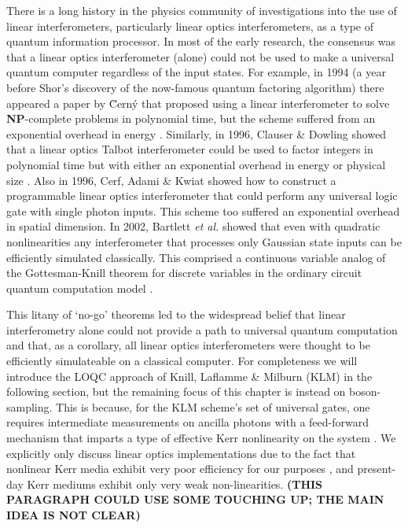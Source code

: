 \documentclass[aps,pra,twocolumn,amsmath,amssymb,nofootinbib,superscriptaddress]{revtex4}
\begin{document}
There is a long history in the physics community of investigations into the use of linear interferometers, particularly linear optics interferometers, as a type of quantum information processor. In most of the early research, the consensus was that a linear optics interferometer (alone) could not be used to make a universal quantum computer regardless of the input states. For example, in 1994 (a year before Shor's discovery of the now-famous quantum factoring algorithm) there appeared a paper by {\u C}ern{\' y} that proposed using a linear interferometer to solve \textbf{NP}-complete problems in polynomial time, but the scheme suffered from an exponential overhead in energy \cite{cerny}. Similarly, in 1996, Clauser \& Dowling showed that a linear optics Talbot interferometer could be used to factor integers in polynomial time but with either an exponential overhead in energy or physical size \cite{clauser}. Also in 1996, Cerf, Adami \& Kwiat showed how to construct a programmable linear optics interferometer that could perform any universal logic gate with single photon inputs.  This scheme too suffered an exponential overhead in spatial dimension. In 2002, Bartlett \emph{et al.} showed that even with quadratic nonlinearities any interferometer that processes only Gaussian state inputs can be efficiently simulated classically.  This comprised a continuous variable analog of the Gottesman-Knill theorem for discrete variables in the ordinary circuit quantum computation model \cite{bart}. 

This litany of `no-go' theorems led to the widespread belief that linear interferometry alone could not provide a path to universal quantum computation and that, as a corollary, all linear optics interferometers were thought to be efficiently simulateable on a classical computer. For completeness we will introduce the LOQC approach of Knill, Laflamme \& Milburn (KLM) \cite{knill,kok} in the following section, but the remaining focus of this chapter is instead on boson-sampling. This is because, for the KLM scheme's set of universal gates, one requires intermediate measurements on ancilla photons with a feed-forward mechanism that imparts a type of effective Kerr nonlinearity on the system \cite{lap}. We explicitly only discuss linear optics implementations due to the fact that nonlinear Kerr media exhibit very poor efficiency for our purposes \cite{nielsen}, and present-day Kerr mediums exhibit only very weak non-linearities. \textbf{(THIS PARAGRAPH COULD USE SOME TOUCHING UP; THE MAIN IDEA IS NOT CLEAR)}
\end{document}
